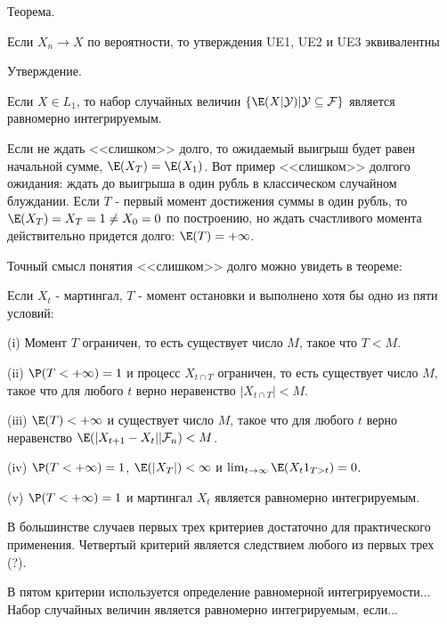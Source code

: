 {Теорема. \par
Если $X_{n} \rightarrow X$ по вероятности, то утверждения UE1, UE2
и UE3 эквивалентны \par

Утверждение. \par
Если $X \in L_{1}$, то набор случайных величин
$\{\E(X|\mathcal{Y})|\mathcal{Y}\subseteq \mathcal{F}\}$ является
равномерно интегрируемым. \par





Если не ждать <<слишком>> долго, то ожидаемый выигрыш будет равен начальной сумме, $\E(X_{T})=\E(X_{1})$. Вот пример <<слишком>> долгого ожидания: ждать до выигрыша в один рубль в классическом случайном блуждании. Если $T$ - первый момент достижения суммы в один рубль, то $\E(X_{T})=X_{T}=1\neq X_{0}=0$ по построению, но ждать счастливого момента действительно придется долго: $\E(T)=+\infty$.

Точный смысл понятия <<слишком>> долго можно увидеть в теореме: 

Если $X_{t}$ - мартингал, $T$ - момент остановки и выполнено хотя бы одно из пяти условий: 

(i) Момент $T$ ограничен, то есть существует число $M$, такое что $T<M$. 

(ii) $\P(T<+\infty)=1$ и процесс $X_{t\cap T}$ ограничен, то есть существует число $M$, такое что для любого $t$ верно неравенство $|X_{t\cap T}|<M$. 

(iii) $\E(T)<+\infty$ и существует число $M$, такое что для любого $t$ верно неравенство $\E(|X_{t+1}-X_{t}||\mathcal{F}_{n})<M$.

(iv) $\P(T<+\infty)=1$, $\E(|X_{T}|)<\infty$ и $\lim_{t\to\infty}\E(X_{t}1_{T>t})=0$.

(v) $\P(T<+\infty)=1$ и мартингал $X_{t}$ является равномерно интегрируемым.

В большинстве случаев первых трех критериев достаточно для практического применения.
Четвертый критерий является следствием любого из первых трех (?).

В пятом критерии используется определение равномерной интегрируемости...
Набор случайных величин является равномерно интегрируемым, если...


}
